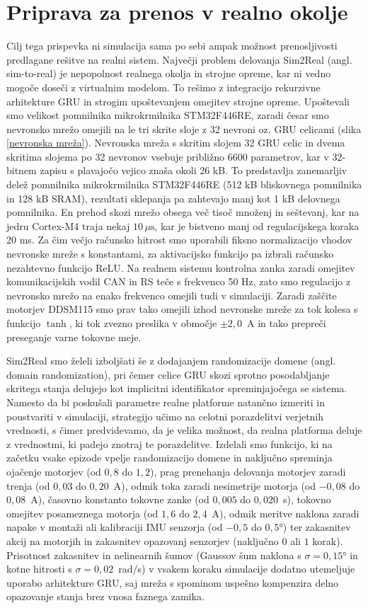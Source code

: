 \section{Priprava za prenos v realno okolje}
Cilj tega prispevka ni simulacija sama po sebi ampak mož\-nost prenosljivosti predlagane rešitve na realni sistem. Največji problem delovanja Sim2Real (angl. sim-to-real) je nepopolnost realnega okolja in strojne opreme, kar ni vedno mogoče doseči z virtualnim modelom. To rešimo z integracijo rekurzivne arhitekture GRU in strogim upo\-šte\-va\-njem omejitev strojne opreme. Upoštevali smo velikost pomnilnika mikrokrmilnika STM32F446RE, zaradi česar smo nevronsko mrežo omejili na le tri skrite sloje z 32 nevroni oz. GRU celicami (slika \ref{nevronska mreža}). Nevronska mreža s skritim slojem 32 GRU celic in dvema skritima slojema po 32 nevronov vsebuje približno 6600 parametrov, kar v 32-bitnem zapisu s plavajočo vejico znaša okoli 26 kB. To predstavlja zanemarljiv delež pomnilnika mikrokrmilnika STM32F446RE (512 kB bliskovnega pomnilnika in 128 kB SRAM), rezultati sklepanja pa zahtevajo manj kot 1 kB delovnega pomnilnika. En prehod skozi mrežo obsega več tisoč množenj in seštevanj, kar na jedru Cortex-M4 traja nekaj $10\,\mu\text{s}$, kar je bistveno manj od regulacijskega koraka 20 ms. Za čim večjo računsko hitrost smo uporabili fiksno normalizacijo vhodov nevronske mreže s konstantami, za aktivacijsko funkcijo pa izbrali računsko nezahtevno funkcijo ReLU. Na realnem sistemu kontrolna zanka zaradi omejitev komunikacijskih vodil CAN in RS teče s frekvenco 50 Hz, zato smo regulacijo z nevronsko mrežo na enako frekvenco omejili tudi v simulaciji. Zaradi zaščite motorjev DDSM115 smo prav tako omejili izhod nevronske mreže za tok kolesa s funkcijo $\tanh$, ki tok zvezno preslika v območje $\pm 2{,}0$~A in tako prepreči preseganje varne tokovne meje.
  
  Sim2Real smo želeli izboljšati še z dodajanjem randomizacije domene (angl. domain randomization), pri čemer celice GRU skozi sprotno posodabljanje skritega stanja delujejo kot implicitni identifikator spreminjajočega se sistema. Namesto da bi poskušali parametre realne platforme natančno izmeriti in poustvariti v simulaciji, strategijo učimo na celotni porazdelitvi verjetnih vrednosti, s čimer predvidevamo, da je velika možnost, da realna platforma deluje z vrednostmi, ki padejo znotraj te porazdelitve. Izdelali smo funkcijo, ki na začetku vsake epizode vpelje randomizacijo domene in naključno spreminja ojačenje motorjev (od $0{,}8$ do $1{,}2$), prag prenehanja delovanja motorjev zaradi trenja (od $0{,}03$ do $0{,}20$~A), odmik toka zaradi nesimetrije motorja (od $-0{,}08$ do $0{,}08$~A), časovno konstanto tokovne zanke (od $0{,}005$ do $0{,}020$~s), tokovno omejitev posameznega motorja (od $1{,}6$ do $2{,}4$~A), odmik meritve naklona zaradi napake v montaži ali kalibraciji IMU senzorja (od $-0{,}5$ do $0{,}5$°) ter zakasnitev akcij na motorjih in zakasnitev opazovanj senzorjev (naključno $0$ ali $1$ korak). Prisotnost zakasnitev in nelinearnih šumov (Gaussov šum naklona s $\sigma = 0{,}15$° in kotne hitrosti s $\sigma = 0{,}02$~rad/s) v vsakem koraku simulacije dodatno utemeljuje uporabo arhitekture GRU, saj mreža s spominom uspešno kompenzira delno opazovanje stanja brez vnosa faznega zamika.